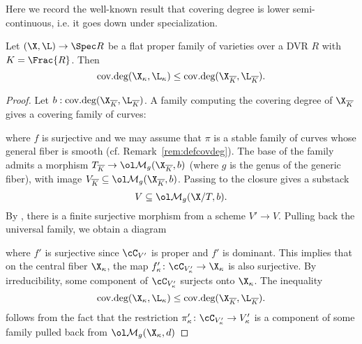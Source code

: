 \documentclass[12pt]{article}
\DeclareMathOperator{\covdeg}{\text{cov.deg}}
\begin{document}
Here we record the well-known result that covering degree is lower semi-continuous, i.e. it goes down under specialization.

\begin{lemma} \label{lemma:lowersemicontinuity}
Let $(\X, \L) \rightarrow \Spec R$ be a flat proper family of varieties over a DVR $R$ with $K = \Frac{R}$. Then
\[ \covdeg(\X_{\kappa}, \L_{\kappa}) \leq \covdeg(\X_{\overline{K}}, \L_{\overline{K}}). \]
\end{lemma}

\begin{proof}
    Let $b : \covdeg(\X_{\overline{K}}, \L_{\overline{K}})$. A family computing the covering degree of $\X_{\overline{K}}$ gives a covering family of curves:
    \begin{center}
    \end{center}
    where $f$ is surjective and we may assume that $\pi$ is a stable family of curves whose general fiber is smooth (cf. Remark~\ref{rem:defcovdeg}). The base of the family admits a morphism $T_{\overline{K}} \rightarrow \Mbar_{g}(\X_{\overline{K}}, b)$ (where $g$ is the genus of the generic fiber), with image $V_{\overline{K}} \subseteq \Mbar_{g}(\X_{\overline{K}}, b)$. Passing to the closure gives a substack
    \[ V \subseteq \Mbar_{g}(\X/T, b). \]
    By \cite[Prop 2.6]{Vis89}, there is a finite surjective morphism from a scheme $V' \rightarrow V$. Pulling back the universal family, we obtain a diagram
    \begin{center}
    \end{center}
    where $f'$ is surjective since $\cC_{V'}$ is proper and $f'$ is dominant. This implies that on the central fiber $\X_{\kappa}$, the map $f'_{\kappa} \colon \cC_{V'_{\kappa}} \rightarrow \X_{\kappa}$ is also surjective. By irreducibility, some component of $\cC_{V'_{\kappa}}$ surjects onto $\X_{\kappa}$. The inequality \[ \covdeg(\X_{\kappa}, \L_{\kappa}) \leq \covdeg(\X_{\overline{K}}, \L_{\overline{K}}). \] follows from the fact that the restriction $\pi'_{\kappa} \colon \cC_{V'_{\kappa}} \rightarrow V'_{\kappa}$ is a component of some family pulled back from $\Mbar_{g}(\X_{\kappa}, d)$
\end{proof}
\end{document}
